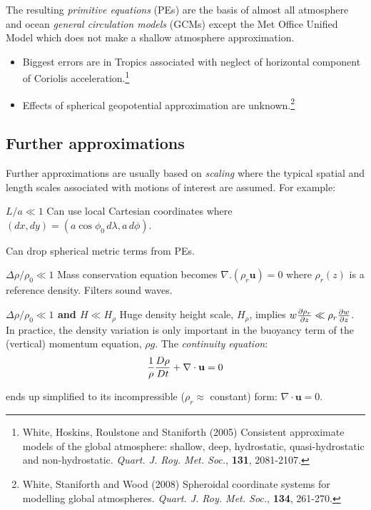 The resulting {\em primitive equations} (PEs) are the basis of almost
all atmosphere and ocean {\em general circulation models} (GCMs)
except the Met Office Unified Model which does not make a shallow
atmosphere approximation.

\begin{itemize}
	\item
	Biggest errors are in Tropics associated with neglect of horizontal
	component of Coriolis acceleration.\footnote{\BTi White, Hoskins, Roulstone and Staniforth (2005) Consistent approximate models of the global atmosphere: shallow, deep, hydrostatic, quasi-hydrostatic and non-hydrostatic. \emph{Quart. J. Roy. Met. Soc.}, \textbf{131},
		2081-2107.
		\ETi }
	
	\item
	Effects of spherical geopotential approximation are unknown.\footnote{\BTi White, Staniforth and Wood (2008) Spheroidal coordinate systems for modelling global atmospheres. \emph{Quart. J. Roy. Met. Soc.}, \textbf{134},
		261-270.
		\ETi }
\end{itemize}


\subsection{Further approximations} 

Further approximations are usually based on {\em scaling} where
the typical spatial and length scales associated with motions of
interest are assumed. For example:

\begin{definition}

{\bf $L/a \ll 1$} Can use local Cartesian coordinates where $(dx,dy)=(a \cos\phi_0
\,d\lambda, a\,d\phi)$. 

Can drop spherical metric terms from PEs.
\end{definition}


\begin{definition}
{\bf $\Delta \rho /\rho_0 \ll 1$} Mass conservation equation becomes $\nabla.(\rho_r {\mathbf u})=0$
where $\rho_r(z)$ is a reference density.
Filters sound waves.
\end{definition}

\begin{definition}
{\bf $\Delta \rho /\rho_0 \ll 1$ and $H\ll H_{\rho}$} Huge density height scale, $H_{\rho}$, implies $w \frac{\partial \rho_r}{\partial z}\ll
\rho_r \frac{\partial w}{\partial z}$. In practice, the density variation is only important in the buoyancy term of the (vertical) momentum equation, $\rho g$. The \emph{continuity equation}:
\begin{equation}
	\frac{1}{\rho} \frac{D \rho}{D t} + \nabla \cdot \mathbf{u} = 0
	\label{continuity-equation}
\end{equation}

ends up simplified to its incompressible ($\rho_r \approx$ constant) form: $\nabla \cdot \mathbf{u} = 0$. 

\end{definition}

